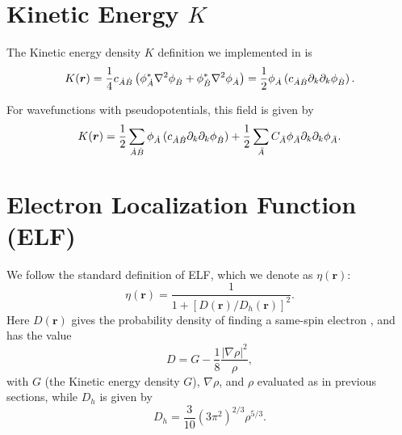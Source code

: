 \section{Kinetic Energy $K$}

The Kinetic energy density $K$ definition we implemented in \DTK{} is
%
\begin{equation}
   K(\boldsymbol{r})=\frac{1}{4}c_{\dot{A}\dot{B}}\left(\phi_{\dot{A}}^*\nabla^2\phi_{\dot{B}}+\phi_{\dot{B}}^*\nabla^2\phi_{\dot{A}}\right)=\frac{1}{2}\phi_{\dot{A}}\left(c_{\dot{A}\dot{B}}\partial_k\partial_k\phi_{\dot{B}}\right).
\end{equation}
%

For wavefunctions with pseudopotentials, this field is given by
%
\begin{equation}%
  K(\boldsymbol{r})=\frac{1}{2}\sum_{\dA\dB}
    \phi_{\dA}\left(c_{\dA\dB}\partial_k\partial_k\phi_{\dB}\right)
    +\frac{1}{2}\sum_{\bA}C_{\bA}\phi_{\bA}\partial_k\partial_k\phi_{\bA}.
\end{equation}
%


\section{Electron Localization Function (ELF)}

We follow the standard definition of ELF, which we denote as $\eta(\boldsymbol{r})$:
%
\begin{equation}
   \eta(\boldsymbol{r})=\frac{1}{1+[D(\boldsymbol{r})/D_h(\boldsymbol{r})]^2}.
\end{equation}
%
Here $D(\boldsymbol{r})$ gives the probability density of finding a same-spin electron \cite{bib:becke1990}, and has the value
%
\begin{equation}
   D=G-\frac{1}{8}\frac{|\nabla\rho|^2}{\rho},
\end{equation}
%
with $G$ (the Kinetic energy density $G$), $\nabla\rho$, and $\rho$ evaluated as in previous sections, while $D_h$ is given by
%
\begin{equation}
   D_h=\frac{3}{10}(3\pi^2)^{2/3}\rho^{5/3}.
\end{equation}
%

